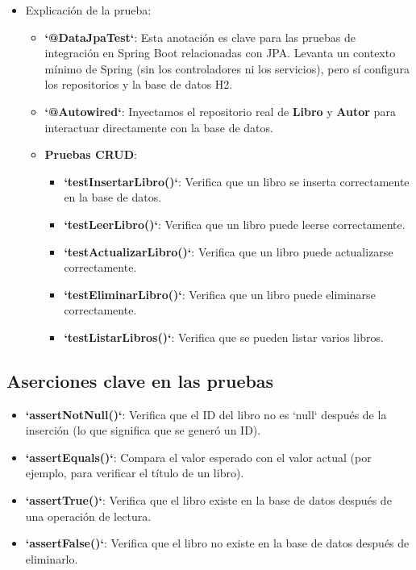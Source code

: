 \documentclass[11pt]{article}
\begin{document}
\begin{itemize}
\item Explicación de la prueba:
\label{sec:org1972034}
\begin{itemize}
\item \textbf{\textbf{`@DataJpaTest`}}: Esta anotación es clave para las pruebas de integración en Spring Boot relacionadas con JPA. Levanta un contexto mínimo de Spring (sin los controladores ni los servicios), pero sí configura los repositorios y la base de datos H2.
\item \textbf{\textbf{`@Autowired`}}: Inyectamos el repositorio real de \textbf{\textbf{Libro}} y \textbf{\textbf{Autor}} para interactuar directamente con la base de datos.
\item \textbf{\textbf{Pruebas CRUD}}:
\begin{itemize}
\item \textbf{\textbf{`testInsertarLibro()`}}: Verifica que un libro se inserta correctamente en la base de datos.
\item \textbf{\textbf{`testLeerLibro()`}}: Verifica que un libro puede leerse correctamente.
\item \textbf{\textbf{`testActualizarLibro()`}}: Verifica que un libro puede actualizarse correctamente.
\item \textbf{\textbf{`testEliminarLibro()`}}: Verifica que un libro puede eliminarse correctamente.
\item \textbf{\textbf{`testListarLibros()`}}: Verifica que se pueden listar varios libros.
\end{itemize}
\end{itemize}
\end{itemize}

\subsection{Aserciones clave en las pruebas}
\label{sec:org460eafd}
\begin{itemize}
\item \textbf{\textbf{`assertNotNull()`}}: Verifica que el ID del libro no es `null` después de la inserción (lo que significa que se generó un ID).
\item \textbf{\textbf{`assertEquals()`}}: Compara el valor esperado con el valor actual (por ejemplo, para verificar el título de un libro).
\item \textbf{\textbf{`assertTrue()`}}: Verifica que el libro existe en la base de datos después de una operación de lectura.
\item \textbf{\textbf{`assertFalse()`}}: Verifica que el libro no existe en la base de datos después de eliminarlo.
\end{itemize}
\end{document}
